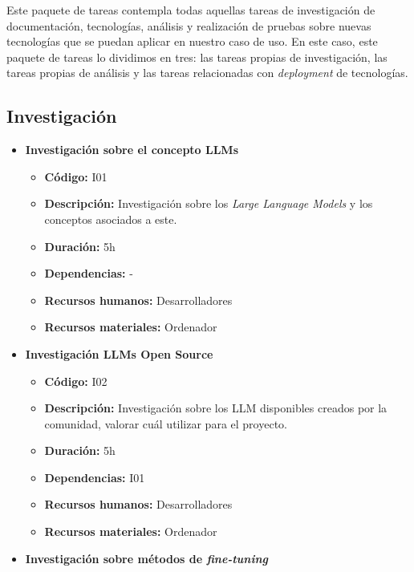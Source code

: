 
Este paquete de tareas contempla todas aquellas tareas de investigación de documentación, tecnologías, análisis y realización de pruebas sobre nuevas tecnologías
que se puedan aplicar en nuestro caso de uso. En este caso, este paquete de tareas lo dividimos en tres: las tareas propias de investigación, las tareas propias de
análisis y las tareas relacionadas con \textit{deployment} de tecnologías.

\subsection{Investigación}
\label{subsec:tareas_investigacion}


\begin{itemize}
    \item \textbf{Investigación sobre el concepto LLMs}
        \begin{itemize}
            \item \textbf{Código:} I01
            \item \textbf{Descripción:} Investigación sobre los \textit{Large Language Models} y los conceptos asociados a este.
            \item \textbf{Duración:} 5h
            \item \textbf{Dependencias:} -
            \item \textbf{Recursos humanos:} Desarrolladores
            \item \textbf{Recursos materiales:} Ordenador
        \end{itemize}
    \item \textbf{Investigación LLMs Open Source}
        \begin{itemize}
            \item \textbf{Código:} I02
            \item \textbf{Descripción:} Investigación sobre los LLM disponibles creados por la comunidad, valorar cuál utilizar para el proyecto.
            \item \textbf{Duración:} 5h
            \item \textbf{Dependencias:} I01
            \item \textbf{Recursos humanos:} Desarrolladores
            \item \textbf{Recursos materiales:} Ordenador
        \end{itemize}
    \item \textbf{Investigación sobre métodos de \textit{fine-tuning}}

\end{itemize}
